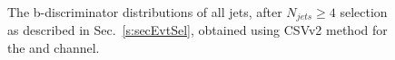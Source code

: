 \begin{center}
\begin{figure}
\caption{The b-discriminator distributions of all jets, after $N_{jets} \geq 4$ selection as described in Sec.~\ref{s:secEvtSel}, obtained using CSVv2 method for the \mujets and \ejets channel.}
\label{fig:pfCISV_lepBTag}
\end{figure}
\end{center}

